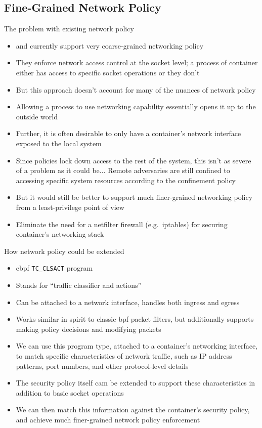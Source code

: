 \subsection{Fine-Grained Network Policy}%
\label{ss:disc-fine-grained-network}

\begin{inprogress}
  The problem with existing network policy
  \begin{itemize}
    \item \bpfbox{} and \bpfcontain{} currently support very coarse-grained networking policy
    \item They enforce network access control at the socket level; a process of container
    either has access to specific socket operations or they don't
    \item But this approach doesn't account for many of the nuances of network policy
    \item Allowing a process to use networking capability essentially opens it up to the outside world
    \item Further, it is often desirable to only have a container's network interface exposed to the local system
    \item Since policies lock down access to the rest of the system, this isn't as severe of a problem as it could be... Remote adversaries are still confined to accessing specific system resources according to the confinement policy
    \item But it would still be better to support much finer-grained networking policy from a least-privilege point of view
    \item Eliminate the need for a netfilter firewall (e.g.~iptables) for securing container's networking stack
  \end{itemize}

  How network policy could be extended
  \begin{itemize}
    \item \gls{ebpf} \texttt{TC\_CLSACT} program
    \item Stands for \enquote{traffic classifier and actions}
    \item Can be attached to a network interface, handles both ingress and egress
    \item Works similar in spirit to classic \gls{bpf} packet filters, but additionally supports making policy decisions and modifying packets
    \item We can use this program type, attached to a container's networking interface, to match specific characteristics of network traffic,
    such as IP address patterns, port numbers, and other protocol-level details
    \item The security policy itself cam be extended to support these characteristics in addition to basic socket operations
    \item We can then match this information against the container's security policy, and achieve much finer-grained network policy enforcement
  \end{itemize}
\end{inprogress}

